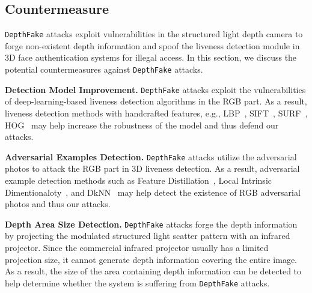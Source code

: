 


\subsection{Countermeasure}
\texttt{DepthFake} attacks exploit vulnerabilities in the structured light depth camera to forge non-existent depth information and spoof the liveness detection module in 3D face authentication systems for illegal access.
In this section, we discuss the potential countermeasures against \texttt{DepthFake} attacks.

\textbf{Detection Model Improvement. } \texttt{DepthFake} attacks exploit the vulnerabilities of deep-learning-based liveness detection algorithms in the RGB part. 
As a result, liveness detection methods with handcrafted features, e.g., LBP~\cite{de2012lbp, boulkenafet2015face}, SIFT~\cite{patel2016secure}, SURF~\cite{boulkenafet2016face}, HOG~\cite{komulainen2013context} may help increase the robustness of the model and thus defend our attacks. 

\textbf{Adversarial Examples Detection.} \texttt{DepthFake} attacks utilize the adversarial photos to attack the RGB part in  3D liveness detection. 
As a result, adversarial example detection methods such as Feature Distillation~\cite{liu2019feature}, Local Intrinsic Dimentionaloty~\cite{ma2018characterizing}, and DkNN~\cite{papernot2018deep}  may help detect the existence of  RGB adversarial photos and thus our attacks.

\textbf{Depth Area Size Detection. }  \texttt{DepthFake} attacks forge the depth information by projecting the modulated structured light scatter pattern with an infrared projector. Since the commercial infrared projector usually has a limited projection size, it cannot generate depth information covering the entire image. As a result,  the size of the area containing depth information can be detected to help determine whether the system is suffering from \texttt{DepthFake} attacks.

